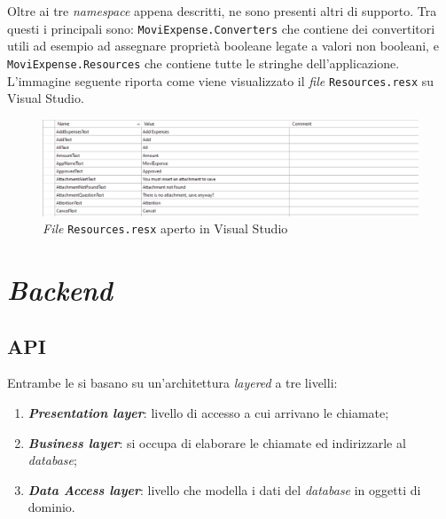 \vspace{1.5cm}

\noindent Oltre ai tre \textit{namespace} appena descritti, ne sono presenti altri di supporto. Tra questi i principali sono: \texttt{MoviExpense.Converters} che contiene dei convertitori utili ad esempio ad assegnare proprietà booleane legate a valori non booleani, e \texttt{MoviExpense.Resources} che contiene tutte le stringhe dell'applicazione. L'immagine seguente riporta come viene visualizzato il \textit{file} \texttt{Resources.resx} su Visual Studio.

\begin{figure}[H]
    \centering
    \includegraphics[width=\columnwidth]{images/resources.png}
    \caption{\textit{File} \texttt{Resources.resx} aperto in Visual Studio}
\end{figure}



\section{\textit{Backend}}

\subsection{API}

Entrambe le  si basano su un'architettura \textit{layered} a tre livelli:
\begin{enumerate}
    \item \textit{\textbf{Presentation layer}}: livello di accesso a cui arrivano le chiamate;
    \item \textit{\textbf{Business layer}}: si occupa di elaborare le chiamate ed indirizzarle al \textit{database};
    \item \textit{\textbf{Data Access layer}}: livello che modella i dati del \textit{database} in oggetti di dominio.
\end{enumerate}

